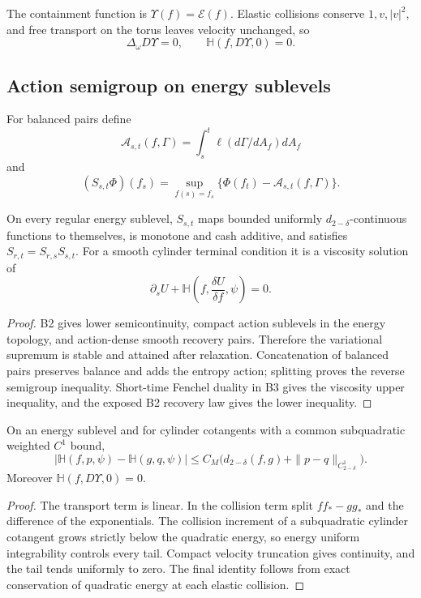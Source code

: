 The containment function is
\(\Upsilon(f)=\mathcal E(f)\).  Elastic collisions conserve
\(1,v,|v|^2\), and free transport on the torus leaves velocity unchanged, so
\[
 \Delta_\omega D\Upsilon=0,
 \qquad
 \mathbb H(f,D\Upsilon,0)=0.
\]

\subsection{Action semigroup on energy sublevels}

For balanced pairs define
\[
 \mathcal A_{s,t}(f,\Gamma)
 =\int_s^t\ell(d\Gamma/dA_f)dA_f
\]
and
\[
 (S_{s,t}\Phi)(f_s)
 =\sup_{f(s)=f_s}
 \{\Phi(f_t)-\mathcal A_{s,t}(f,\Gamma)\}.
\]

\begin{theorem}
\label{thm:r3-b4-action}
On every regular energy sublevel, \(S_{s,t}\) maps bounded uniformly
\(d_{2-\delta}\)-continuous functions to themselves, is monotone and cash
additive, and satisfies
\(S_{r,t}=S_{r,s}S_{s,t}\).  For a smooth cylinder terminal condition it is a
viscosity solution of
\[
 \partial_sU+
 \mathbb H\left(f,\frac{\delta U}{\delta f},\psi\right)=0.
\]
\end{theorem}

\begin{proof}
B2 gives lower semicontinuity, compact action sublevels in the energy topology,
and action-dense smooth recovery pairs.  Therefore the variational supremum is
stable and attained after relaxation.  Concatenation of balanced pairs
preserves balance and adds the entropy action; splitting proves the reverse
semigroup inequality.  Short-time Fenchel duality in B3 gives the viscosity
upper inequality, and the exposed B2 recovery law gives the lower inequality.
\end{proof}

\begin{lemma}
\label{lem:r3-b4-hcont}
On an energy sublevel and for cylinder cotangents with a common subquadratic
weighted \(C^1\) bound,
\[
 |\mathbb H(f,p,\psi)-\mathbb H(g,q,\psi)|
 \le C_M\big(d_{2-\delta}(f,g)+
 \|p-q\|_{C^1_{2-\delta}}\big).
\]
Moreover \(\mathbb H(f,D\Upsilon,0)=0\).
\end{lemma}

\begin{proof}
The transport term is linear.  In the collision term split
\(ff_*-gg_*\) and the difference of the exponentials.  The collision increment
of a subquadratic cylinder cotangent grows strictly below the quadratic energy,
so energy uniform integrability controls every tail.  Compact velocity
truncation gives continuity, and the tail tends uniformly to zero.  The final
identity follows from exact conservation of quadratic energy at each elastic
collision.
\end{proof}

